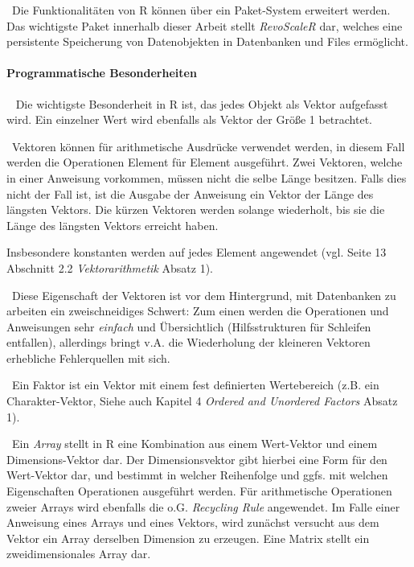~\newline Die Funktionalitäten von R können über ein Paket-System erweitert werden. Das wichtigste Paket innerhalb dieser Arbeit stellt \textit{RevoScaleR} dar, welches eine persistente Speicherung von Datenobjekten in Datenbanken und Files ermöglicht. 

\paragraph{Programmatische Besonderheiten}~\newline
Die wichtigste Besonderheit in R ist, das jedes Objekt als Vektor aufgefasst wird. Ein einzelner Wert wird ebenfalls als Vektor der Größe 1 betrachtet.

~\newline Vektoren können für arithmetische Ausdrücke verwendet werden, in diesem Fall werden die Operationen Element für Element ausgeführt. Zwei Vektoren, welche in einer Anweisung vorkommen, müssen nicht die selbe Länge besitzen. Falls dies nicht der Fall ist, ist die Ausgabe der Anweisung ein Vektor der Länge des längsten Vektors. Die kürzen Vektoren werden solange wiederholt, bis sie die Länge des längsten Vektors erreicht haben.

Insbesondere konstanten werden auf jedes Element angewendet (vgl. \cite{RIntro} Seite 13 Abschnitt 2.2 \textit{Vektorarithmetik} Absatz 1).

~\newline Diese Eigenschaft der Vektoren ist vor dem Hintergrund, mit Datenbanken zu arbeiten ein zweischneidiges Schwert: Zum einen werden die Operationen und Anweisungen sehr \textit{einfach} und Übersichtlich (Hilfsstrukturen für Schleifen entfallen), allerdings bringt v.A. die Wiederholung der kleineren Vektoren erhebliche Fehlerquellen mit sich. 

~\newline Ein Faktor ist ein Vektor mit einem fest definierten Wertebereich (z.B. ein Charakter-Vektor, Siehe auch \cite{RIntro} Kapitel 4 \textit{Ordered and Unordered Factors} Absatz 1).

~\newline Ein \textit{Array} stellt in R eine Kombination aus einem Wert-Vektor und einem Dimensions-Vektor dar. Der Dimensionsvektor gibt hierbei eine Form für den Wert-Vektor dar, und bestimmt in welcher Reihenfolge und ggfs. mit welchen Eigenschaften Operationen ausgeführt werden. Für arithmetische Operationen zweier Arrays wird ebenfalls die o.G. \textit{Recycling Rule} angewendet. Im Falle einer Anweisung eines Arrays und eines Vektors, wird zunächst versucht aus dem Vektor ein Array derselben Dimension zu erzeugen. Eine Matrix stellt ein zweidimensionales Array dar. 

